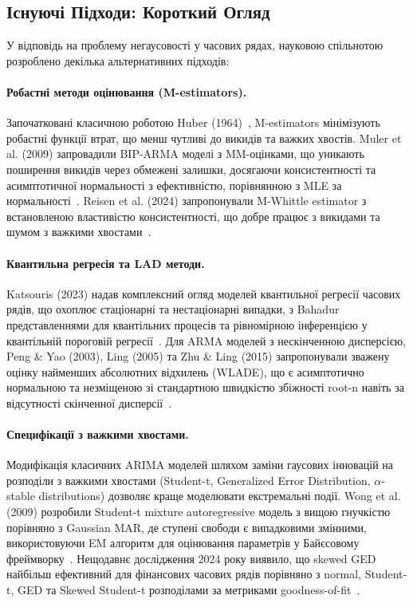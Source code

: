 \documentclass[12pt,a4paper]{article}
\begin{document}
\subsection{Існуючі Підходи: Короткий Огляд}
\label{subsec:existing_approaches}

У відповідь на проблему негаусовості у часових рядах, науковою спільнотою розроблено декілька альтернативних підходів:

\paragraph{Робастні методи оцінювання (M-estimators).} Започатковані класичною роботою Huber (1964)~\cite{huber1964robust}, M-estimators мінімізують робастні функції втрат, що менш чутливі до викидів та важких хвостів. Muler et al. (2009) запровадили BIP-ARMA моделі з MM-оцінками, що уникають поширення викидів через обмежені залишки, досягаючи консистентності та асимптотичної нормальності з ефективністю, порівнянною з MLE за нормальності~\cite{muler2009robust}. Reisen et al. (2024) запропонували M-Whittle estimator з встановленою властивістю консистентності, що добре працює з викидами та шумом з важкими хвостами~\cite{reisen2024robust}.

\paragraph{Квантильна регресія та LAD методи.} Katsouris (2023) надав комплексний огляд моделей квантильної регресії часових рядів, що охоплює стаціонарні та нестаціонарні випадки, з Bahadur представленнями для квантільних процесів та рівномірною інференцією у квантільній пороговій регресії~\cite{katsouris2023quantile}. Для ARMA моделей з нескінченною дисперсією, Peng \& Yao (2003), Ling (2005) та Zhu \& Ling (2015) запропонували зважену оцінку найменших абсолютних відхилень (WLADE), що є асимптотично нормальною та незміщеною зі стандартною швидкістю збіжності root-n навіть за відсутності скінченної дисперсії~\cite{peng2003least,ling2005self,zhu2015model}.

\paragraph{Специфікації з важкими хвостами.} Модифікація класичних ARIMA моделей шляхом заміни гаусових інновацій на розподіли з важкими хвостами (Student-t, Generalized Error Distribution, $\alpha$-stable distributions) дозволяє краще моделювати екстремальні події. Wong et al. (2009) розробили Student-t mixture autoregressive модель з вищою гнучкістю порівняно з Gaussian MAR, де ступені свободи є випадковими змінними, використовуючи EM алгоритм для оцінювання параметрів у Байєсовому фреймворку~\cite{wong2009student}. Нещодавнє дослідження 2024 року виявило, що skewed GED найбільш ефективний для фінансових часових рядів порівняно з normal, Student-t, GED та Skewed Student-t розподілами за метриками goodness-of-fit~\cite{palacios2024comparative}.
\end{document}
